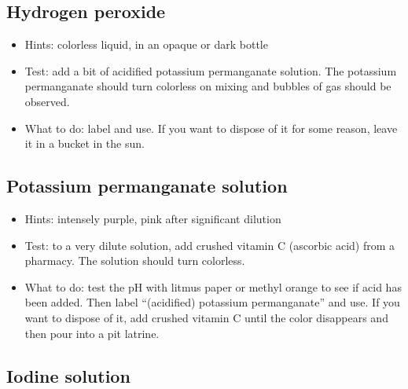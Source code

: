 \subsection{Hydrogen peroxide} 

\begin{itemize}

\item{Hints: colorless liquid, 
in an opaque or dark bottle}

\item{Test: add a bit of acidified potassium permanganate solution. 
The potassium permanganate should turn colorless 
on mixing and bubbles of gas should be observed.}

\item{What to do: label and use. 
If you want to dispose of it for some reason, 
leave it in a bucket in the sun.}

\end{itemize}

\subsection{Potassium permanganate solution}

\begin{itemize}

\item{Hints: intensely purple, 
pink after significant dilution}

\item{Test: to a very dilute solution, 
add crushed vitamin C (ascorbic acid) from a pharmacy. 
The solution should turn colorless.}

\item{What to do: test the pH with litmus paper 
or methyl orange to see if acid has been added. 
Then label ``(acidified) potassium permanganate'' and use. 
If you want to dispose of it, 
add crushed vitamin C until the color disappears 
and then pour into a pit latrine.}

\end{itemize}

\subsection{Iodine solution} 

